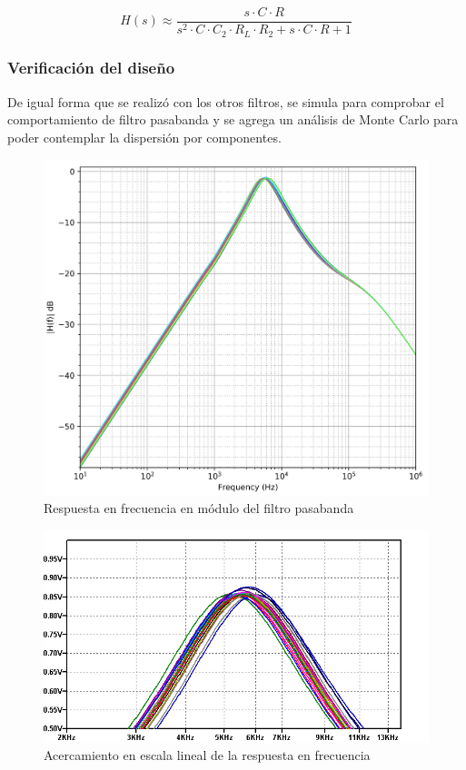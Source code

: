 \begin{equation}
    H(s) \approx \frac{s \cdot C \cdot R}{s^{2} \cdot C \cdot C_2 \cdot R_L \cdot R_2 + s \cdot C \cdot R + 1}
\end{equation}

\subsubsection{Verificaci\'on del dise\~no}
De igual forma que se realiz\'o con los otros filtros, se simula para comprobar el comportamiento de filtro pasabanda y se agrega un an\'alisis de Monte Carlo para poder
contemplar la dispersi\'on por componentes.

\begin{figure}[H]
    \centering
        \includegraphics[scale=0.12]{../EJ2/Recursos/bd_montecarlo.png}    
    \caption{Respuesta en frecuencia en m\'odulo del filtro pasabanda}
    \label{fig:bd_montecarlo}
\end{figure}

\begin{figure}[H]
    \centering
        \includegraphics[scale=0.6]{../EJ2/Recursos/bp_montecarlo_frecuencia.png}
    \caption{Acercamiento en escala lineal de la respuesta en frecuencia}
    \label{fig:bp_montecarlo_frecuencia}
\end{figure}

